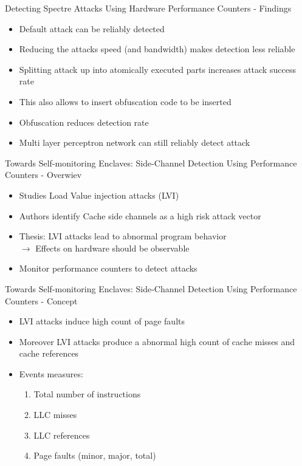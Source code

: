 \documentclass[aspectratio=169]{beamer}
\begin{document}
\begin{frame}{Detecting Spectre Attacks Using Hardware Performance Counters - Findings}
    \begin{itemize}
        \item Default attack can be reliably detected
        \item Reducing the attacks speed (and bandwidth) makes detection less reliable
        \item Splitting attack up into atomically executed parts increases attack success rate
        \item This also allows to insert obfuscation code to be inserted
        \item Obfuscation reduces detection rate
        \item Multi layer perceptron network can still reliably detect attack
    \end{itemize}
\end{frame}
\begin{frame}{Towards Self-monitoring Enclaves: Side-Channel Detection Using Performance Counters - Overwiev}
    \begin{itemize}
        \item Studies Load Value injection attacks (LVI)
        \item Authors identify Cache side channels as a high risk attack vector
        \item Thesis: LVI attacks lead to abnormal program behavior
              \\ $\rightarrow$ Effects on hardware should be observable
        \item Monitor performance counters to detect attacks
    \end{itemize}
\end{frame}
\begin{frame}{Towards Self-monitoring Enclaves: Side-Channel Detection Using Performance Counters - Concept}
    \begin{itemize}
        \item LVI attacks induce high count of page faults
        \item Moreover LVI attacks produce a abnormal high count of cache misses and cache references
        \item Events measures:
              \begin{enumerate}
                  \item Total number of instructions
                  \item LLC misses
                  \item LLC references
                  \item Page faults (minor, major, total)
              \end{enumerate}
    \end{itemize}
\end{frame}
\end{document}
